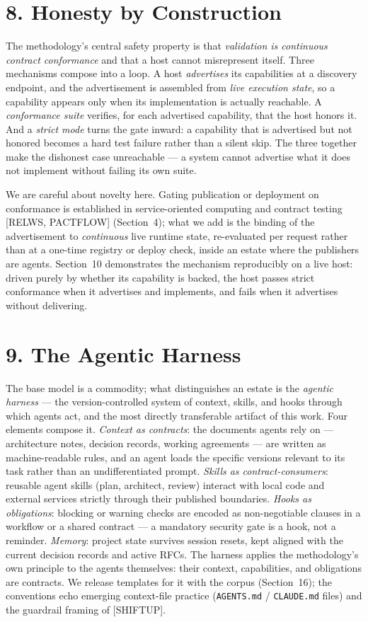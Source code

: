 \documentclass[11pt]{article}
\begin{document}
\section*{8. Honesty by Construction}
The methodology's central safety property is that \emph{validation is continuous contract conformance}
and that a host cannot misrepresent itself. Three mechanisms compose into a loop. A host
\emph{advertises} its capabilities at a discovery endpoint, and the advertisement is assembled from
\emph{live execution state}, so a capability appears only when its implementation is actually
reachable. A \emph{conformance suite} verifies, for each advertised capability, that the host honors
it. And a \emph{strict mode} turns the gate inward: a capability that is advertised but not honored
becomes a hard test failure rather than a silent skip. The three together make the dishonest case
unreachable --- a system cannot advertise what it does not implement without failing its own suite.

We are careful about novelty here. Gating publication or deployment on conformance is established in
service-oriented computing and contract testing [RELWS, PACTFLOW] (Section~4); what we add is the
binding of the advertisement to \emph{continuous} live runtime state, re-evaluated per request rather
than at a one-time registry or deploy check, inside an estate where the publishers are agents.
Section~10 demonstrates the mechanism reproducibly on a live host: driven purely by whether its
capability is backed, the host passes strict conformance when it advertises and implements, and fails
when it advertises without delivering.

\section*{9. The Agentic Harness}
The base model is a commodity; what distinguishes an estate is the \emph{agentic harness} --- the
version-controlled system of context, skills, and hooks through which agents act, and the most directly
transferable artifact of this work. Four elements compose it. \emph{Context as contracts}: the
documents agents rely on --- architecture notes, decision records, working agreements --- are written
as machine-readable rules, and an agent loads the specific versions relevant to its task rather than an
undifferentiated prompt. \emph{Skills as contract-consumers}: reusable agent skills (plan, architect,
review) interact with local code and external services strictly through their published boundaries.
\emph{Hooks as obligations}: blocking or warning checks are encoded as non-negotiable clauses in a
workflow or a shared contract --- a mandatory security gate is a hook, not a reminder.
\emph{Memory}: project state survives session resets, kept aligned with the current decision records
and active RFCs. The harness applies the methodology's own principle to the agents themselves: their
context, capabilities, and obligations are contracts. We release templates for it with the corpus
(Section~16); the conventions echo emerging context-file practice (\texttt{AGENTS.md} /
\texttt{CLAUDE.md} files) and the guardrail framing of [SHIFTUP].
\end{document}
